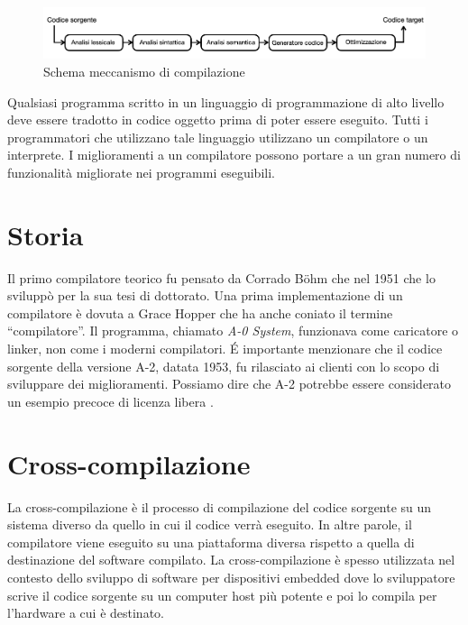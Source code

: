 \documentclass[12pt, a4paper]{report}
\begin{document}
\begin{figure}
\centering
\includegraphics[width = \textwidth]{SchemaCompilatore.png}
\caption{Schema meccanismo di compilazione}
\label{Fig:MeccanismoCompilazione}
\end{figure}%

Qualsiasi programma scritto in un linguaggio di programmazione di alto livello deve essere tradotto in codice oggetto prima di poter essere eseguito. Tutti i programmatori che utilizzano tale linguaggio utilizzano un compilatore o un interprete. I miglioramenti a un compilatore possono portare a un gran numero di funzionalità migliorate nei programmi eseguibili.

\section{Storia}
Il primo compilatore teorico fu pensato da Corrado Böhm che nel 1951 che lo sviluppò per la sua tesi di dottorato. Una prima implementazione di un compilatore è dovuta a Grace Hopper che ha anche coniato il termine ``compilatore''. Il programma, chiamato \textit{A-0 System}\cite{SystemA0}, funzionava come caricatore o linker, non come i moderni compilatori. \'E importante menzionare che il codice sorgente della versione A-2, datata 1953, fu rilasciato ai clienti con lo scopo di sviluppare dei miglioramenti. Possiamo dire che A-2 potrebbe essere considerato un esempio precoce di licenza libera \cite{openSource1, openOrg, stallman2003software}. 


\section{Cross-compilazione}
\label{Sec:Cross}
La cross-compilazione è il processo di compilazione del codice sorgente su un sistema diverso da quello in cui il codice verrà eseguito. In altre parole, il compilatore viene eseguito su una piattaforma diversa rispetto a quella di destinazione del software compilato. La cross-compilazione è spesso utilizzata nel contesto dello sviluppo di software per dispositivi embedded dove lo sviluppatore scrive il codice sorgente su un computer host più potente e poi lo compila per l'hardware a cui è destinato.
\end{document}

